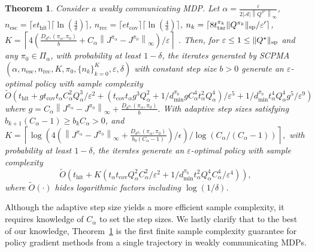 \documentclass{article}
\newtheorem{theorem}{Theorem}[section]
\theoremstyle{definition}
\theoremstyle{remark}
\newcommand{\cA}{\mathcal{A}}
\newcommand*{\infn}[1]{\left\|{#1}\right\|_{\infty}}
\renewcommand{\sp}[1]{\|{#1}\|_\text{\rm sp}}
\begin{document}
\begin{theorem}\label{sam:SCPMA}
Consider a weakly communicating MDP. Let $\alpha = \frac{\varepsilon}{2|\cA| \infn{Q^{\pi^\star}}}$,  $n_{\mathrm{esc}} =\lceil e t_{\mathrm{hit}}\rceil \lceil\ln (\frac{4}{\delta})\rceil$, $n_{\mathrm{rec}}  =  \lceil  e t_{\mathrm{cov}}\rceil \lceil \ln (\frac{4}{\delta})\rceil$, $n_k = \lceil 8 t^{\pi_k}_{\mathrm{tar}}\sp{Q^{\pi_k}}/\varepsilon'\rceil$, $
K= \left\lceil4\left( \frac{D_{d^{\pi_\alpha}}({\pi_\alpha}, \pi_0)}{b}
+ C_\alpha\infn{J^{\pi_\alpha}-J^{\pi_0}} \right)/\varepsilon \right\rceil$ . Then, for $\varepsilon \le 1 \le \sp{Q^\star}$ and  any $\pi_0 \in \Pi_\alpha$, with probability at least $1-\delta$, the iterates generated by SCPMA$(\alpha, n_{\mathrm{esc}},n_{\mathrm{rec}},K,\pi_0, \{n_{k}\}^K_{k=0}, \varepsilon, \delta)$ with constant step size $b>0$
generate an $\varepsilon$-optimal policy with sample complexity 
\[
\widetilde{O}\left(t_{\mathrm{hit}}+gt_{\mathrm{cov}}t_{\alpha}C_\alpha^2Q_\alpha^3/\varepsilon^2+(t_{\mathrm{cov}}t_{\alpha}g^3Q_\alpha^2+1/d^{\pi_b}_{\mathrm{min}}g C^4_\alpha t_{\alpha}^2 Q_\alpha^4)/\varepsilon^5+ 1/d^{\pi_b}_{\mathrm{min}} t_{\alpha}^4Q_\alpha^4g^5/\varepsilon^{9}\right)
\]
where $g=C_\alpha\infn{J^{\pi_\alpha}-J^{\pi_0}}+\frac{D_{d^{\pi_\alpha}}({\pi_\alpha}, \pi_0)}{b}.$ With adaptive step sizes satisfying $b_{k+1}(C_\alpha  - 1) \ge b_k C_\alpha >0$, and $
K= \left\lceil
\log \left(4(\infn{J^{\pi_\alpha}-J^{\pi_0}}
+ \frac{D_{d^{\pi_\alpha}}(\pi_\alpha, \pi_{0})}{b_0(C_\alpha-1)})/\epsilon
\right)/ \log(C_\alpha /  (C_\alpha-1)) \right\rceil,$ with probability at least $1-\delta$,
the iterates generate an $\varepsilon$-optimal policy with sample complexity 
\[
\widetilde{O}\left(t_{\mathrm{hit}}+K(t_\alpha t_{\mathrm{cov}} Q_\alpha^2C_\alpha^2/\varepsilon^{2}+ 1/d^{\pi_b}_{\mathrm{min}} t_\alpha^2Q_\alpha^4C_\alpha^4/\varepsilon^{4})\right),
\]
where $\widetilde{O}(\cdot)$ hides logarithmic factors including $\log(1/\delta)$.
\end{theorem}

Although the adaptive step size yields a more efficient sample complexity, it requires knowledge of $C_{\alpha}$ to set the step sizes. We lastly clarify that to the best of our knowledge, Theorem~\ref{sam:SCPMA} is the first finite sample complexity guarantee for policy gradient methods from a single trajectory in weakly communicating MDPs.
\end{document}
